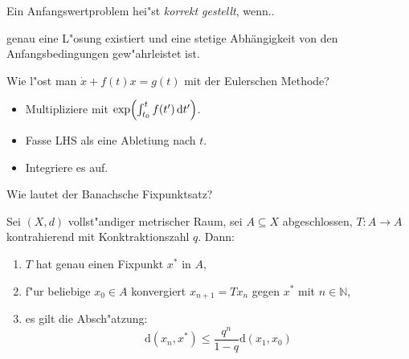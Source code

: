 \documentclass[9pt]{article}
\newenvironment{field}{}{\newpage}
\newif\ifnote
\newenvironment{note}{\notetrue}{\notefalse}
\newcommand{\localtag}{}
\newcommand{\globaltag}{}
\newcommand{\uuid}{}
\newcommand{\tags}[1]{
    \ifnote 
        \renewcommand{\localtag}{#1}
    \else
        \renewcommand{\globaltag}{#1}
    \fi 
    }
\newcommand{\xplain}[1]{\renewcommand{\uuid}{#1}}
\begin{document}
\begin{note}
	\xplain{caa48b6b-bfe0-4009-8d36-da9a13f48910}  %
	\tags{definition, 3.1.3}
	
	\begin{field}  %
		Ein Anfangswertproblem  hei"st \textit{korrekt gestellt}, wenn..
	\end{field}  
	
	\begin{field}  %
		genau eine L"osung existiert und eine stetige Abhängigkeit von den Anfangsbedingungen gew"ahrleistet ist. 
	\end{field}
\end{note}

\begin{note}
	\xplain{e7470fcc-afc7-4b91-a141-8e0d5c7677f8}  %
	\tags{GDGL, methode, 3.2.7.1}
	
	\begin{field}  %
		Wie l"ost man $\dot{x} + f(t)x = g(t)$ mit der Eulerschen Methode? 
	\end{field}  
	
	\begin{field}  %
		\begin{itemize}
			\item Multipliziere mit $\exp(\int_{t_0}^{t}f(t') \dif t')$.
			\item Fasse LHS als eine Abletiung nach $t$.
			\item Integriere es auf.
		\end{itemize}
	\end{field}
\end{note}

\begin{note}
	\xplain{512aa0ca-bf37-44a1-a507-4a2c51a90f65}  %
	\tags{satz, 3.3 , fixpunkt}
	
	\begin{field}  %
		Wie lautet der Banachsche Fixpunktsatz?
	\end{field}  
	
	\begin{field}  %
		Sei $(X,d)$ vollst"andiger metrischer Raum, sei $A \subseteq X$ abgeschlossen,
		$T: A \rightarrow A$ kontrahierend mit Konktraktionszahl $q$. Dann:
		\begin{enumerate}
			\item $T$ hat genau einen Fixpunkt $x^*$ in $A$,
			\item f"ur beliebige $x_0 \in A$ konvergiert $x_{n+1} = T{x_n}$ gegen $x^*$ mit $n \in \mathbb{N}$,
			\item es gilt die Absch"atzung:
			\begin{equation*}
				\mathrm{d} (x_n,x^*) \leq \frac{q^n}{1-q}\mathrm{d}(x_1,x_0)
			\end{equation*} 
		\end{enumerate}
	\end{field}
\end{note}
\end{document}
